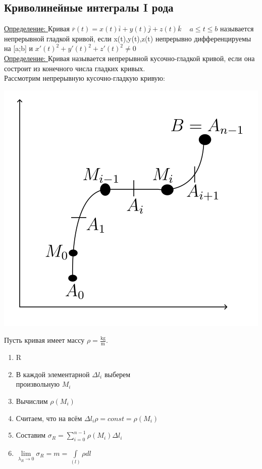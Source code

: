 \documentclass[12pt]{article}
\let\ORIincludegraphics\includegraphics
\renewcommand{\includegraphics}[2][]{\ORIincludegraphics[scale=0.65,#1]{#2}}
\let\oldint\int
\let\oldsum\sum
\let\oldlim\lim
\renewcommand{\int}{\oldint\limits}
\renewcommand{\sum}{\oldsum\limits}
\renewcommand{\lim}{\oldlim\limits}
\begin{document}
  \subsection{Криволинейные интегралы I рода}
  \underline{Определение: } Кривая $\overline{r}(t)=x(t)\overline{i}+y(t)\overline{j}+z(t)\overline{k} \hspace{10pt}$
  $a \leq t \leq b$ называется непрерывной гладкой кривой, если x(t),y(t),z(t) непрерывно дифференцируемы
  на [a;b] и $x'(t)^2+y'(t)^2+z'(t)^2 \not = 0$\\
  \underline{Определение: } Кривая называется непрерывной кусочно-гладкой кривой, если она состроит из конечного числа
  гладких кривых.\\
  Рассмотрим непрерывную кусочно-гладкую кривую:\\
  \begin{minipage}{0.45\textwidth} 
      \includegraphics[width=\linewidth]{8.1.1.png}
  \end{minipage}
  \hspace{1em} 
  \begin{minipage}{0.65\textwidth} 
      Пусть кривая имеет массу $\rho=\frac{\mathrm{kg}}{\mathrm{m}}$.
      \begin{enumerate}
        \item R
        \item В каждой элементарной $\Delta l_i$ выберем\\ произвольную $M_i$ 
        \item Вычислим $\rho(M_i)$
        \item Считаем, что на всём $\Delta l_i \rho=const=\rho(M_i)$
        \item Составим $\sigma_R=\sum_{i=0}^{n-1}\rho(M_i)\Delta l_i$
        \item $\lim_{\lambda_R \to 0} \sigma_R = m = \int_{(l)} \rho dl$
      \end{enumerate}
  \end{minipage}
\end{document}
